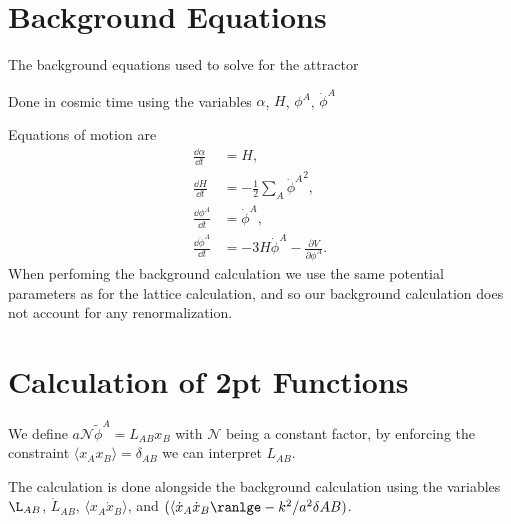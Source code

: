 

\section{Background Equations}
The background equations used to solve for the attractor

Done in cosmic time using the variables $\alpha$, $H$, $\phi^A$, $\dot{\phi}^A$

Equations of motion are
\begin{align}
  \frac{\dd\alpha}{\dd t} &= H, \\
  \frac{\dd H}{\dd t} &= -\frac{1}{2}\sum_A{\dot{\phi}^A}^2, \\
  \frac{\dd\phi^A}{\dd t} &= \dot{\phi}^A, \\
  \frac{\dd\dot{\phi}^A}{\dd t} &= -3H\dot{\phi}^A - \frac{\partial V}{\partial\phi^A}.
\end{align}
When perfoming the background calculation we use the same potential parameters as for the lattice calculation, and so our background calculation does not account for any renormalization.


\section{Calculation of 2pt Functions}
We define $a\mathcal{N}\tilde{\phi}^A = L_{AB}x_B$ with $\mathcal{N}$ being a constant factor, by enforcing the constraint $\langle x_Ax_B \rangle = \delta_{AB}$ we can interpret $L_{AB}$.

The calculation is done alongside the background calculation using the variables $\L_{AB}$, $\dot{L}_{AB}$, $\langle x_A\dot{x}_B \rangle$, and $(\langle \dot{x}_A\dot{x}_B \ranlge - k^2/a^2\delta{AB})$.

